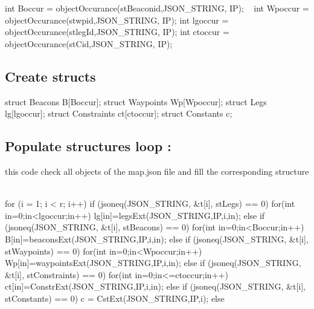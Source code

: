int Boccur = object\+Occurance(st\+Beaconid,\+J\+S\+O\+N\+\_\+\+S\+T\+R\+I\+N\+G, I\+P); ~\newline
 int Wpoccur = object\+Occurance(stwpid,\+J\+S\+O\+N\+\_\+\+S\+T\+R\+I\+N\+G, I\+P); int lgoccur = object\+Occurance(stleg\+Id,\+J\+S\+O\+N\+\_\+\+S\+T\+R\+I\+N\+G, I\+P); int ctoccur = object\+Occurance(st\+Cid,\+J\+S\+O\+N\+\_\+\+S\+T\+R\+I\+N\+G, I\+P); \subsection*{Create structs}

\begin{DoxyVerb}struct Beacons B[Boccur];
struct Waypoints Wp[Wpoccur];
struct Legs lg[lgoccur];
struct Constraints ct[ctoccur];
struct Constants c;
\end{DoxyVerb}


\subsection*{Populate structures loop \+:}

this code check all objects of the map.\+json file and fill the corresponding structure ~\newline
\begin{DoxyVerb}for (i =  1; i < r; i++) {
    if (jsoneq(JSON_STRING, &t[i], stLegs) ==  0) {
        for(int in=0;in<lgoccur;in++){
            lg[in]=legsExt(JSON_STRING,IP,i,in);
        }
    }
    else  if (jsoneq(JSON_STRING, &t[i], stBeacons) ==  0) {
        for(int in=0;in<Boccur;in++){
            B[in]=beaconsExt(JSON_STRING,IP,i,in);
        }
    }
    else  if (jsoneq(JSON_STRING, &t[i], stWaypoints) ==  0) {
        for(int in=0;in<Wpoccur;in++){
            Wp[in]=waypointsExt(JSON_STRING,IP,i,in);
        }
    }
    else  if (jsoneq(JSON_STRING, &t[i], stConstraints) ==  0) {
        for(int in=0;in<=ctoccur;in++){
            ct[in]=ConstrExt(JSON_STRING,IP,i,in);
        }
    }
    else  if (jsoneq(JSON_STRING, &t[i], stConstants) ==  0) {
        c =  CstExt(JSON_STRING,IP,i);
    }
    else{}
}
\end{DoxyVerb}
 